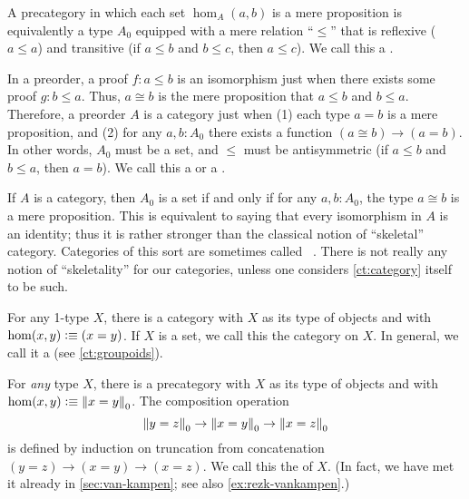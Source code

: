 \begin{eg}\label{ct:orders}
  A precategory in which each set $\hom_A(a,b)$ is a mere proposition is equivalently a type $A_0$ equipped with a mere relation ``$\le$'' that is reflexive ($a\le a$) and transitive (if $a\le b$ and $b\le c$, then $a\le c$).
  We call this a .

  In a preorder, a proof $f\colon a\le b$ is an isomorphism just when there exists some proof $g\colon b\le a$.
  Thus, $a\cong b$ is the mere proposition that $a\le b$ and $b\le a$.
  Therefore, a preorder $A$ is a category just when (1) each type $a=b$ is a mere proposition, and (2) for any $a,b:A_0$ there exists a function $(a\cong b) \to (a=b)$.
  In other words, $A_0$ must be a set, and $\le$ must be antisymmetric (if $a\le b$ and $b\le a$, then $a=b$).
  We call this a  or a .
\end{eg}

\begin{eg}\label{ct:gaunt}
  If $A$ is a category, then $A_0$ is a set if and only if for any $a,b:A_0$, the type $a\cong b$ is a mere proposition.
  This is equivalent to saying that every isomorphism in $A$ is an identity; thus it is rather stronger than the classical notion of ``skeletal'' category.
  Categories of this sort are sometimes called ~\cite{bsp12infncats}.
  There is not really any notion of ``skeletality'' for our categories, unless one considers \autoref{ct:category} itself to be such.
\end{eg}

\begin{eg}\label{ct:discrete}
  For any 1-type $X$, there is a category with $X$ as its type of objects and with $\hom(x,y) \vcentcolon\equiv (x=y)$.
  If $X$ is a set, we call this the  category on $X$.
  In general, we call it a  (see \autoref{ct:groupoids}).
\end{eg}

\begin{eg}\label{ct:fundgpd}
  For \emph{any} type $X$, there is a precategory with $X$ as its type of objects and with $\hom(x,y) \vcentcolon\equiv \left\Vert x=y\right\Vert_{0}$.
  The composition operation
  \[ \left\Vert y=z\right\Vert_{0} \to \left\Vert x=y\right\Vert_{0} \to \left\Vert x=z\right\Vert_{0} \]
  is defined by induction on truncation from concatenation $(y=z)\to(x=y)\to(x=z)$.
  We call this the  of $X$.
  (In fact, we have met it already in \autoref{sec:van-kampen}; see also \autoref{ex:rezk-vankampen}.)
\end{eg}

